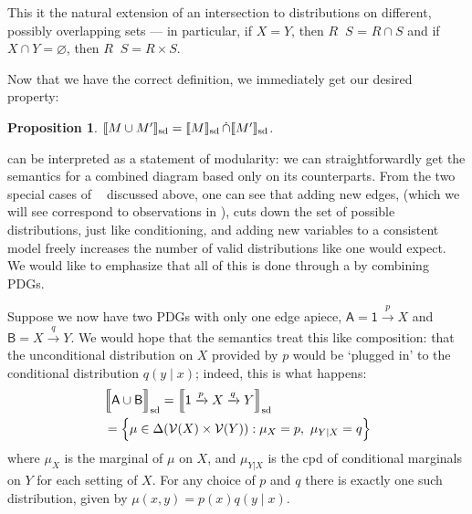 \documentclass{article}
\theoremstyle{plain}
\newtheorem{prop}[theorem]{Proposition}
\theoremstyle{definition}
\newenvironment{example}
	{\pushQED{\qed}\renewcommand{\qedsymbol}{$\triangle$}\examplex}
	{\popQED\endexamplex%
}
\theoremstyle{remark}
\newcommand{\notation}[2][]{#1}
\renewcommand{\notation}[2][]{{\color{notationcolor} #2}}
\DeclarePairedDelimiter{\SD}{\llbracket}{\rrbracket_{\text{sd}}}
\DeclareMathOperator\dcap{\mathop{\dot\cap}}
\newcommand{\V}{\mathcal V}
\newcommand{\MN}{PDG}
\newcommand{\MNs}{\MN s}
\numberwithin{equation}{section}
\begin{document}
\begin{vfull}
\begin{defn}[$\dcap$]
		This it the natural extension of an intersection to distributions on different, possibly overlapping sets --- in particular, if $X = Y$, then $R \dcap S$ = $R \cap S$ and if \notation[$X$ and $Y$ are disjoint]{$X \cap Y = \varnothing$}, then $R \dcap S = R \times S$. 
	\end{defn}
	
	
	Now that we have the correct definition, we immediately get our desired property:
	
	\begin{prop}\label{prop:union-set-semantics}
		$\SD{M \cup M'} = \SD{M} \dcap \SD{M'}$.
	\end{prop}

	 can be interpreted as a statement of modularity: we can straightforwardly get the semantics for a combined diagram based only on its counterparts. 
	From the two special cases of $\dcap$ discussed above, one can see that adding new edges, (which we will see correspond to observations in ), cuts down the set of possible distributions, just like conditioning, and adding new variables to a consistent model freely increases the number of valid distributions like one would expect. We would like to emphasize that all of this is done through a by combining \MNs.
	
	\begin{example}\label{ex:sd-compose-unconditional}
		Suppose we now have two PDGs with only one edge apiece, $\mathsf A = {\mathsf 1} \xrightarrow{p} X$ and $\mathsf B = X \xrightarrow{q} Y$. We would hope that the semantics treat this like composition: that the unconditional distribution on $X$ provided by $p$ would be `plugged in' to the conditional distribution $q(y \mid x)$; indeed, this is what happens:
		\begin{align*}
			&\SD[\Big]{{\sf A \cup B}} = \SD[\Big]{{\mathsf 1} \xrightarrow{p} X \xrightarrow{q} Y} \\
				&= \Big\{  \mu \in \Delta(\V(X) \times \V(Y)) : \mu_X = p,~\mu_{Y|X} = q \Big\} 
		\end{align*}
		where $\mu_X$ is the marginal of $\mu$ on $X$, and $\mu_{Y|X}$ is the cpd of conditional marginals on $Y$ for each setting of $X$.
		For any choice of $p$ and $q$ there is exactly one such distribution, given by $\mu(x,y) = p(x) q(y \mid x)$.
	\end{example}



\end{vfull}
\end{document}
